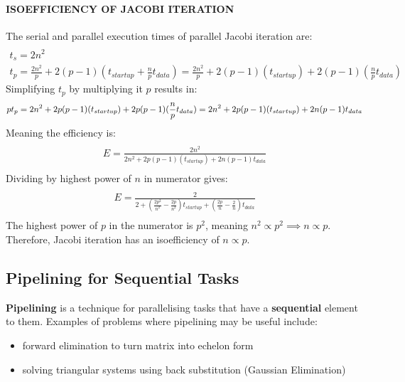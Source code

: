\documentclass{article}
\begin{document}
\paragraph{\textbf{ISOEFFICIENCY OF JACOBI ITERATION}} The serial and parallel execution times of parallel Jacobi iteration are:
\begin{multline}\\
	t_s = 2n^2 \\
	t_p = \frac{2n^2}{p} + 2(p - 1)(t_{startup} + \frac{n}{p}t_{data}) = \frac{2n^2}{p} + 2(p - 1)(t_{startup}) + 2(p - 1)(\frac{n}{p}t_{data})
\end{multline}
Simplifying $t_p$ by multiplying it $p$ results in:
\begin{equation}
	pt_p = 2n^2 + 2p(p - 1)(t_{startup}) + 2p(p - 1)(\frac{n}{p}t_{data}) \\
	=  2n^2 + 2p(p - 1)(t_{startup}) + 2n(p - 1)t_{data}
\end{equation}
Meaning the efficiency is:
\begin{multline} \\
E = \frac{2n^2}{2n^2 + 2p(p - 1)(t_{startup}) + 2n(p - 1)t_{data}} \\
\end{multline}
Dividing by highest power of $n$ in numerator gives:
\begin{multline} \\
	E = \frac{2}{2 + (\frac{2p^2}{n^2} - \frac{2p}{n^2})t_{startup} + (\frac{2p}{n} - \frac{2}{n})t_{data}} \\
\end{multline}
The highest power of $p$ in the numerator is $p^2$, meaning $n^2 \propto p^2 \implies n \propto p$. Therefore, Jacobi iteration has an isoefficiency of $n \propto p$.

\subsection{Pipelining for Sequential Tasks}

\textbf{Pipelining} is a technique for parallelising tasks that have a \textbf{sequential} element to them. Examples of problems where pipelining may be useful include:
\begin{itemize}
	\item forward elimination to turn matrix into echelon form
	\item solving triangular systems using back substitution (Gaussian Elimination)
\end{itemize}
\end{document}
